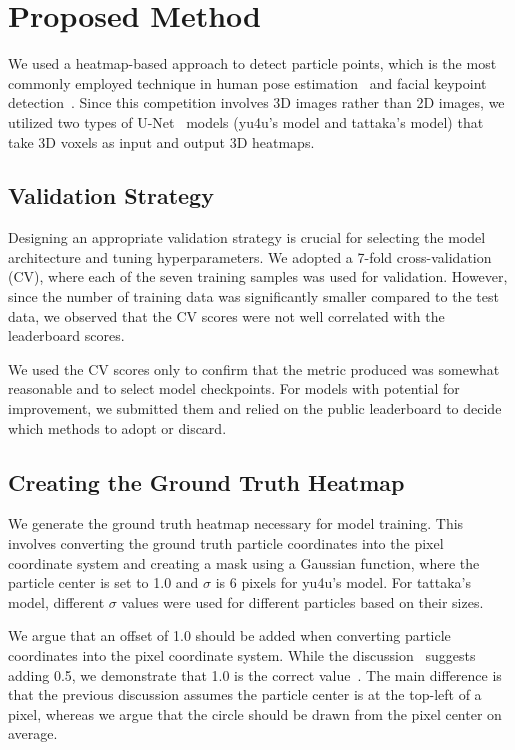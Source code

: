 \section{Proposed Method}

We used a heatmap-based approach to detect particle points, which is the most commonly employed technique in human pose estimation~\cite{Newell2026} and facial keypoint detection~\cite{Bulat2017}.
Since this competition involves 3D images rather than 2D images, we utilized two types of U-Net~\cite{Ronneberger2015} models (yu4u's model and tattaka's model) that take 3D voxels as input and output 3D heatmaps.

\subsection{Validation Strategy}
Designing an appropriate validation strategy is crucial for selecting the model architecture and tuning hyperparameters.  
We adopted a 7-fold cross-validation (CV), where each of the seven training samples was used for validation.
However, since the number of training data was significantly smaller compared to the test data, we observed that the CV scores were not well correlated with the leaderboard scores.

We used the CV scores only to confirm that the metric produced was somewhat reasonable and to select model checkpoints. For models with potential for improvement, we submitted them and relied on the public leaderboard to decide which methods to adopt or discard.


\subsection{Creating the Ground Truth Heatmap}
We generate the ground truth heatmap necessary for model training. This involves converting the ground truth particle coordinates into the pixel coordinate system and creating a mask using a Gaussian function, where the particle center is set to 1.0 and $\sigma$ is 6 pixels for yu4u's model. For tattaka's model, different $\sigma$ values were used for different particles based on their sizes.

We argue that an offset of 1.0 should be added when converting particle coordinates into the pixel coordinate system. While the discussion~\cite{David2025} suggests adding 0.5, we demonstrate that 1.0 is the correct value~\cite{yu4u2025}. The main difference is that the previous discussion assumes the particle center is at the top-left of a pixel, whereas we argue that the circle should be drawn from the pixel center on average.


